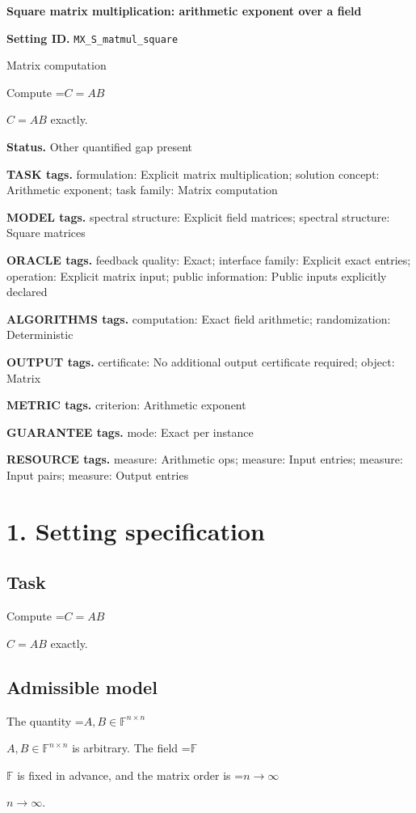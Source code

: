 \documentclass[10pt,a4paper]{article}
\newcommand{\AtlasMath}[1]{\par\begingroup\centering\setbox0=\hbox{$\displaystyle #1$}\ifdim\wd0>1.4\linewidth\typeout{ATLAS WIDE FORMULA: \the\wd0}\fi\ifdim\wd0>\linewidth\resizebox{\linewidth}{!}{\box0}\else\box0\fi\par\endgroup}
\newcommand{\AtlasInlineMath}[1]{\begingroup\setbox0=\hbox{$#1$}\ifdim\wd0>.4\linewidth\endgroup\AtlasMath{#1}\else\endgroup$#1$\fi}
\begin{document}
\raggedright

{\LARGE\bfseries\sffamily\color{AtlasNavy} Square matrix multiplication: arithmetic exponent over a field\par}\vspace{5pt}
\textbf{Setting ID.} \texttt{MX\_\allowbreak{}S\_\allowbreak{}matmul\_\allowbreak{}square}

Matrix computation

Compute \AtlasInlineMath{C=AB} exactly.

\textbf{Status.} Other quantified gap present

\textbf{TASK tags.} formulation: Explicit matrix multiplication; solution concept: Arithmetic exponent; task family: Matrix computation

\textbf{MODEL tags.} spectral structure: Explicit field matrices; spectral structure: Square matrices

\textbf{ORACLE tags.} feedback quality: Exact; interface family: Explicit exact entries; operation: Explicit matrix input; public information: Public inputs explicitly declared

\textbf{ALGORITHMS tags.} computation: Exact field arithmetic; randomization: Deterministic

\textbf{OUTPUT tags.} certificate: No additional output certificate required; object: Matrix

\textbf{METRIC tags.} criterion: Arithmetic exponent

\textbf{GUARANTEE tags.} mode: Exact per instance

\textbf{RESOURCE tags.} measure: Arithmetic ops; measure: Input entries; measure: Input pairs; measure: Output entries

\section{1. Setting specification}
\subsection{Task}
Compute \AtlasInlineMath{C=AB} exactly.

\subsection{Admissible model}
The quantity \AtlasInlineMath{A,B\in\mathbb{F}^{n\times n}} is arbitrary. The field \AtlasInlineMath{\mathbb{F}} is fixed in advance, and the matrix order is \AtlasInlineMath{n\to\infty}.
\end{document}
